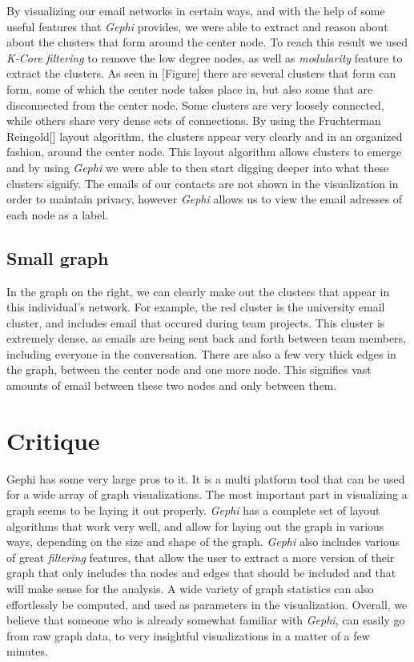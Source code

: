 \documentclass[11pt,letterpaper]{article}
\begin{document}
By visualizing our email networks in certain ways, and with the help of some useful features that \textit{Gephi} provides, we were able to extract and reason about about the clusters that form around the center node. To reach this result we used \textit{K-Core filtering} to remove the low degree nodes, as well as \textit{modularity} feature to extract the clusters. As seen in [Figure] there are several clusters that form can form, some of which the center node takes place in, but also some that are disconnected from the center node. Some clusters are very loosely connected, while others share very dense sets of connections. By using the Fruchterman Reingold[] layout algorithm, the clusters appear very clearly and in an organized fashion, around the center node. This layout algorithm allows clusters to emerge and by using \textit{Gephi} we were able to then start digging deeper into what these clusters signify. The emails of our contacts are not shown in the visualization in order to maintain privacy, however \textit{Gephi} allows us to view the email adresses of each node as a label.

\subsection*{Small graph}
In the graph on the right, we can clearly make out the clusters that appear in this individual's network. For example, the red cluster is the university email cluster, and includes email that occured during team projects. This cluster is extremely dense, as emails are being sent back and forth between team members, including everyone in the conversation. There are also a few very thick edges in the graph, between the center node and one more node. This signifies vast amounts of email between these two nodes and only between them.


\section*{Critique}

Gephi has some very large pros to it. It is a multi platform tool that can be used for a wide array of graph visualizations. The most important part in visualizing a graph seems to be laying it out properly. \textit{Gephi} has a complete set of layout algorithms that work very well, and allow for laying out the graph in various ways, depending on the size and shape of the graph. \textit{Gephi} also includes various of great \textit{filtering} features, that allow the user to extract a more version of their graph that only includes tha nodes and edges that should be included and that will make sense for the analysis. A wide variety of graph statistics can also effortlessly be computed, and used as parameters in the visualization. Overall, we believe that someone who is already somewhat familiar with \textit{Gephi}, can easily go from raw graph data, to very insightful visualizations in a matter of a few minutes.
\end{document}
